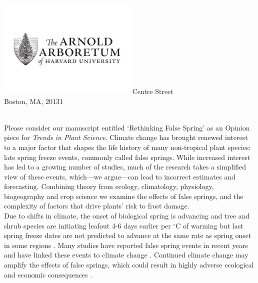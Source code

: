 \documentclass[11pt,a4paper]{article}\usepackage[]{graphicx}\usepackage[]{color}
\begin{document}
\includegraphics[width=0.5\textwidth, right]{AA_logo.jpg}
 Centre Street\\
\noindent Boston, MA, 20131\\


\vspace{1.5ex}




\vspace{3ex}\\
\noindent Please consider our manuscript entitled `Rethinking False Spring' as an Opinion piece for \textit{Trends in Plant Science}. Climate change has brought renewed interest to a major factor that shapes the life history of many non-tropical plant species: late spring freeze events, commonly called false springs. While increased interest has led to a growing number of studies, much of the research takes a simplified view of these events, which---we argue---can lead to incorrect estimates and forecasting. Combining theory from ecology, climatology, physiology, biogeography and crop science we examine the effects of false springs, and the complexity of factors that drive plants' risk to frost damage.\\

\noindent Due to shifts in climate, the onset of biological spring is advancing and tree and shrub species are initiating leafout 4-6 days earlier per $^{\circ}$C of warming \citep{Wolkovich2012, Polgar2014, Fu2015} but last spring freeze dates are not predicted to advance at the same rate as spring onset in some regions \citep{Labe2016}. Many studies have reported false spring events in recent years and have linked these events to climate change \citep[e.g.][]{Augspurger2013, Menzel2015}. Continued climate change may amplify the effects of false springs, which could result in highly adverse ecological and economic consequences \citep{Ault2013, Vitra2017}. \\
\end{document}
